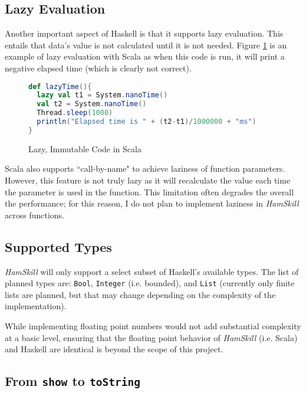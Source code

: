 \documentclass{report}
\begin{document}
\subsection{Lazy Evaluation}\label{sec:lazyEvaluationScala}

Another important aspect of Haskell is that it supports lazy evaluation.  This entails that data's value is not calculated until it is not needed.  Figure \ref{fig:lazyImmutabilityInScala} is an example of lazy evaluation with Scala as when this code is run, it will print a negative elapsed time (which is clearly not correct).

\begin{figure}[H]
\begin{mdframed}
\begin{lstlisting}[language=Scala]
def lazyTime(){
  lazy val t1 = System.nanoTime()
  val t2 = System.nanoTime()
  Thread.sleep(1000)
  println("Elapsed time is " + (t2-t1)/1000000 + "ms")
}
\end{lstlisting}
\end{mdframed}
\caption{Lazy, Immutable Code in Scala}\label{fig:lazyImmutabilityInScala}
\end{figure}

Scala also supports ``call-by-name" to achieve laziness of function parameters.  However, this feature is not truly lazy as it will recalculate the value each time the parameter is used in the function.  This limitation often degrades the overall the performance; for this reason, I do not plan to implement laziness in \emph{HamSkill} across functions.

\subsection{Supported Types}

\emph{HamSkill} will only support a select subset of Haskell's available types.  The list of planned types are: {\tt Bool}, {\tt Integer} (i.e. bounded), and {\tt List} (currently only finite lists are planned, but that may change depending on the complexity of the implementation).

While implementing floating point numbers would not add substantial complexity at a basic level, ensuring that the floating point behavior of \emph{HamSkill} (i.e. Scala) and Haskell are identical is beyond the scope of this project.

\subsection{From {\tt show} to {\tt toString}}
\end{document}

